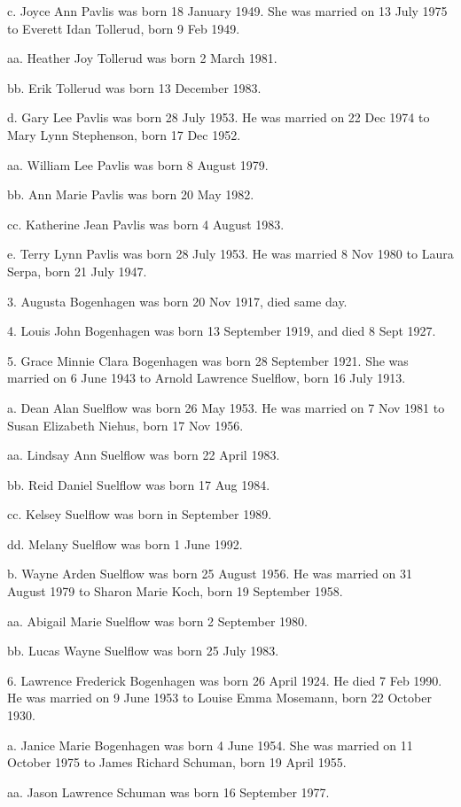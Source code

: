 \documentclass[a4paper]{article}
\begin{document}
c. Joyce Ann Pavlis was born 18 January 1949.  She was married on 13 July 1975 to Everett Idan Tollerud, born 9 Feb 1949.

aa. Heather Joy Tollerud was born 2 March 1981.

bb. Erik Tollerud was born 13 December 1983.  

d. Gary Lee Pavlis was born 28 July 1953.  He was married on 22 Dec 1974 to Mary Lynn Stephenson, born 17 Dec 1952.

aa. William Lee Pavlis was born 8 August 1979.

bb. Ann Marie Pavlis was born 20 May 1982.

cc. Katherine Jean Pavlis was born 4 August 1983.

e. Terry Lynn Pavlis was born 28 July 1953.  He was married 8 Nov 1980 to Laura Serpa, born 21 July 1947.

3. Augusta Bogenhagen was born 20 Nov 1917, died same day.

4. Louis John Bogenhagen was born 13 September 1919, and died 8 Sept 1927.

5. Grace Minnie Clara Bogenhagen was born 28 September 1921.  She was married on 6 June 1943 to Arnold Lawrence Suelflow, born 16 July 1913.

a. Dean Alan Suelflow was born 26 May 1953.  He was married on 7 Nov 1981 to Susan Elizabeth Niehus, born 17 Nov 1956.

aa. Lindsay Ann Suelflow was born 22 April 1983.

bb. Reid Daniel Suelflow was born 17 Aug 1984.

cc. Kelsey Suelflow was born in September 1989.

dd. Melany Suelflow was born 1 June 1992.

b. Wayne Arden Suelflow was born 25 August 1956.  He was married on 31 August 1979 to Sharon Marie Koch, born 19 September 1958.
 
aa. Abigail Marie Suelflow was born 2 September 1980.

bb. Lucas Wayne Suelflow was born 25 July 1983.

6. Lawrence Frederick Bogenhagen was born 26 April 1924.  He died 7 Feb 1990. He was married on 9 June 1953 to Louise Emma Mosemann, born 22 October 1930.

a. Janice Marie Bogenhagen was born 4 June 1954.  She was married on 11 October 1975 to James Richard Schuman,  born 19 April 1955.

aa. Jason Lawrence Schuman was born 16 September 1977.
\end{document}
